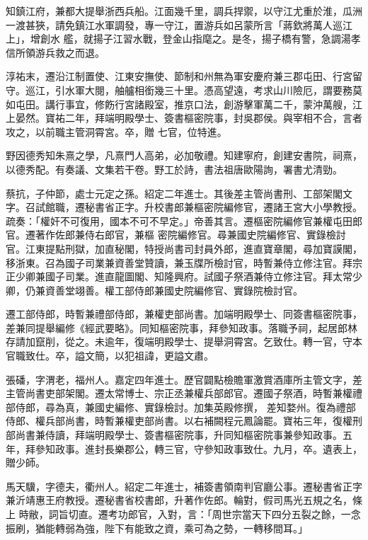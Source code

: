 \begin{pinyinscope}
 知鎮江府，兼都大提舉浙西兵船。江面幾千里，調兵捍禦，以守江尤重於淮，瓜洲一渡甚狹，請免鎮江水軍調發，專一守江，置游兵如呂蒙所言「蔣欽將萬人巡江上」，增創水
 艦，就揚子江習水戰，登金山指麾之。是冬，揚子橋有警，急調湯孝信所領游兵救之而退。



 淳祐末，遷沿江制置使、江東安撫使、節制和州無為軍安慶府兼三郡屯田、行宮留守。巡江，引水軍大閱，舳艫相銜幾三十里。憑高望遠，考求山川險厄，謂要務莫如屯田。講行事宜，修飭行宮諸殿室，推京口法，創游擊軍萬二千，蒙沖萬艘，江上晏然。寶祐二年，拜端明殿學士、簽書樞密院事，封吳郡侯。與宰相不合，言者攻之，以前職主管洞霄宮。卒，贈
 七官，位特進。



 野因德秀知朱熹之學，凡熹門人高弟，必加敬禮。知建寧府，創建安書院，祠熹，以德秀配。有奏議、文集若干卷。野工於詩，書法祖唐歐陽詢，署書尤清勁。



 蔡抗，子仲節，處士元定之孫。紹定二年進士。其後差主管尚書刑、工部架閣文字。召試館職，遷秘書省正字。升校書郎兼樞密院編修官，遷諸王宮大小學教授。疏奏：「權奸不可復用，國本不可不早定。」帝善其言。遷樞密院編修官兼權屯田郎官。遷著作佐郎兼侍右郎官，兼樞
 密院編修官。尋兼國史院編修官、實錄檢討官。江東提點刑獄，加直秘閣，特授尚書司封員外郎，進直寶章閣，尋加寶謨閣，移浙東。召為國子司業兼資善堂贊讀，兼玉牒所檢討官，時暫兼侍立修注官。拜宗正少卿兼國子司業。進直龍圖閣、知隆興府。試國子祭酒兼侍立修注官。拜太常少卿，仍兼資善堂翊善。權工部侍郎兼國史院編修官、實錄院檢討官。



 遷工部侍郎，時暫兼禮部侍郎，兼權吏部尚書。加端明殿學士、同簽書樞密院事，
 差兼同提舉編修《經武要略》。同知樞密院事，拜參知政事。落職予祠，起居郎林存請加竄削，從之。未逾年，復端明殿學士、提舉洞霄宮。乞致仕。轉一官，守本官職致仕。卒，謚文簡，以犯祖諱，更謚文肅。



 張磻，字渭老，福州人。嘉定四年進士。歷官闢點檢贍軍激賞酒庫所主管文字，差主管尚書吏部架閣。遷太常博士、宗正丞兼權兵部郎官。遷國子祭酒，時暫兼權禮部侍郎，尋為真，兼國史編修、實錄檢討。加集英殿修撰，
 差知婺州。復為禮部侍郎、權兵部尚書，時暫兼權吏部尚書。以右補闕程元鳳論罷。寶祐三年，復權刑部尚書兼侍讀，拜端明殿學士、簽書樞密院事，升同知樞密院事兼參知政事。五年，拜參知政事。進封長樂郡公，轉三官，守參知政事致仕。九月，卒。遺表上，贈少師。



 馬天驥，字德夫，衢州人。紹定二年進士，補簽書領南判官廳公事。遷秘書省正字兼沂靖惠王府教授。遷秘書省校書郎，升著作佐郎。輪對，假司馬光五規之名，條上
 時敝，詞旨切直。遷考功郎官，入對，言：「周世宗當天下四分五裂之餘，一念振刷，猶能轉弱為強，陛下有能致之資，乘可為之勢，一轉移間耳。」




\end{pinyinscope}
